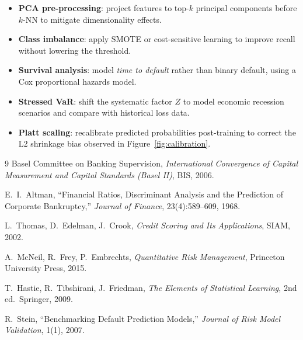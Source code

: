 \documentclass[12pt,a4paper]{article}
\begin{document}
\begin{itemize}[leftmargin=1.8em]
  \item \textbf{PCA pre-processing}: project features to top-$k$ principal
        components before $k$-NN to mitigate dimensionality effects.
  \item \textbf{Class imbalance}: apply SMOTE or cost-sensitive learning
        to improve recall without lowering the threshold.
  \item \textbf{Survival analysis}: model \emph{time to default} rather than
        binary default, using a Cox proportional hazards model.
  \item \textbf{Stressed VaR}: shift the systematic factor $Z$ to model
        economic recession scenarios and compare with historical loss data.
  \item \textbf{Platt scaling}: recalibrate predicted probabilities post-training
        to correct the L2 shrinkage bias observed in Figure~\ref{fig:calibration}.
\end{itemize}

\begin{thebibliography}{9}
  Basel Committee on Banking Supervision,
  \textit{International Convergence of Capital Measurement and Capital Standards
  (Basel II)}, BIS, 2006.

  E.~I.~Altman,
  ``Financial Ratios, Discriminant Analysis and the Prediction of Corporate Bankruptcy,''
  \textit{Journal of Finance}, 23(4):589--609, 1968.

  L.~Thomas, D.~Edelman, J.~Crook,
  \textit{Credit Scoring and Its Applications}, SIAM, 2002.

  A.~McNeil, R.~Frey, P.~Embrechts,
  \textit{Quantitative Risk Management}, Princeton University Press, 2015.

  T.~Hastie, R.~Tibshirani, J.~Friedman,
  \textit{The Elements of Statistical Learning}, 2nd ed.\ Springer, 2009.

  R.~Stein,
  ``Benchmarking Default Prediction Models,''
  \textit{Journal of Risk Model Validation}, 1(1), 2007.
\end{thebibliography}
\end{document}
